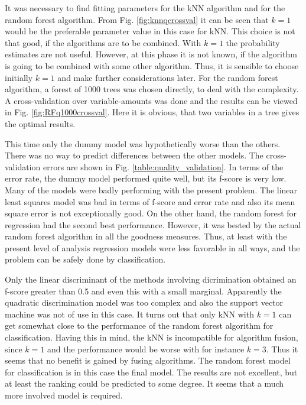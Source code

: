 \documentclass[twoside]{article}
\begin{document}
\begin{multicols}{2}
It was necessary to find fitting parameters for the kNN algorithm and for the random forest algorithm. From Fig. \ref{fig:knnqcrossval}
it can be seen that $k = 1$ would be the preferable parameter value in this case for kNN. This choice is not that good, if the algorithms are to be combined.
With $k = 1$ the probability estimates are not useful. However, at this phase it is not known, if the algorithm is going to be combined with some other
algorithm. Thus, it is sensible to choose initially $k = 1$ and make further considerations later. For the random forest algorithm, 
a forest of 1000 trees was chosen directly, to deal with the complexity. A cross-validation over variable-amounts was done
and the results can be viewed in Fig. \ref{fig:RFq1000crossval}. Here it is obvious, that two variables in a tree gives the optimal results.

This time only the dummy model was hypothetically worse than the others. There was no way to predict differences between the other models. The 
cross-validation errors are shown in Fig. \ref{table:quality_validation}. In terms of the error rate, the dummy model performed quite well, but its 
f-score is very low. Many of the models were badly performing with the present problem. The linear least squares model was bad 
in terms of f-score and error rate and also its mean square error is not exceptionally good. On the other hand, the random forest for regression
had the second best performance. However, it was bested by the actual random forest algorithm in all the goodness measures. Thus, at least with
the present level of analysis regression models were less favorable in all ways, and the problem can be safely done by classification.

Only the linear discriminant of the methods involving dicrimination obtained an f-score greater than 0.5 and even this with a small marginal.
Apparently the quadratic discrimination model was too complex and also the support vector machine was not of use in this case. It turns out 
that only kNN with $k = 1$ can get somewhat close to the performance of the random forest algorithm for classification. Having this in mind,
the kNN is incompatible for algorithm fusion, since $k = 1$ and the performance would be worse with for instance $k = 3$. Thus it seems that
no benefit is gained by fusing algorithms. The random forest model for classification is in this case the final model. The results are not
excellent, but at least the ranking could be predicted to some degree. It seems that a much more involved model is required.


\end{multicols}
\end{document}
